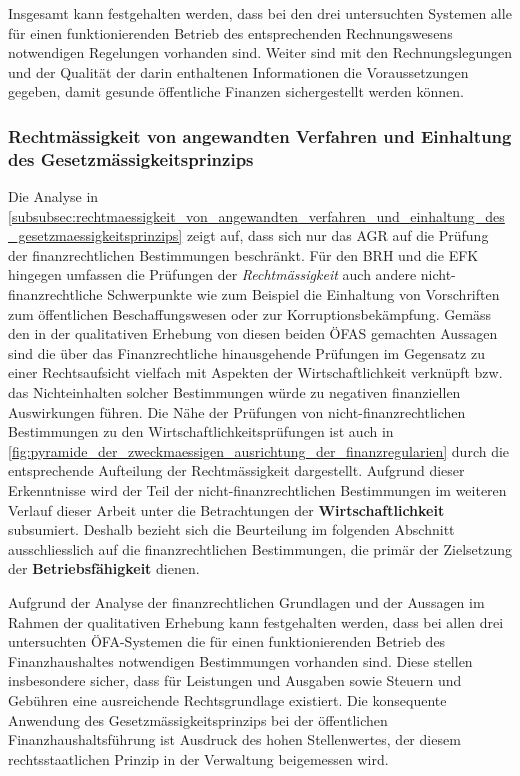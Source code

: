 \documentclass[10pt]{article}
\begin{document}
Insgesamt kann festgehalten werden, dass bei den drei untersuchten Systemen alle für einen funktionierenden Betrieb des entsprechenden Rechnungswesens notwendigen Regelungen vorhanden sind. Weiter sind mit den Rechnungslegungen und der Qualität der darin enthaltenen Informationen die Voraussetzungen gegeben, damit gesunde öffentliche Finanzen sichergestellt werden können.

\subsubsection{Rechtmässigkeit von angewandten Verfahren und Einhaltung des Gesetzmässigkeitsprinzips}\label{subsubsec:rechtmaessigkeit_von_angewandten_verfahren_und_einhaltung_des_gesetzmaessigkeitsprinzips}
Die Analyse in \vref{subsubsec:rechtmaessigkeit_von_angewandten_verfahren_und_einhaltung_des_gesetzmaessigkeitsprinzips} zeigt auf, dass sich nur das AGR auf die Prüfung der finanzrechtlichen Bestimmungen beschränkt. Für den BRH und die EFK hingegen umfassen die Prüfungen der \textit{Rechtmässigkeit} auch andere nicht-finanzrechtliche Schwerpunkte wie zum Beispiel die Einhaltung von Vorschriften zum öffentlichen Beschaffungswesen oder zur Korruptionsbekämpfung. Gemäss den in der qualitativen Erhebung von diesen beiden ÖFAS gemachten Aussagen sind die über das Finanzrechtliche hinausgehende Prüfungen im Gegensatz zu einer Rechtsaufsicht vielfach mit Aspekten der Wirtschaftlichkeit verknüpft bzw. das Nichteinhalten solcher Bestimmungen würde zu negativen finanziellen Auswirkungen führen. Die Nähe der Prüfungen von nicht-finanzrechtlichen Bestimmungen zu den Wirtschaftlichkeitsprüfungen ist auch in \vref{fig:pyramide_der_zweckmaessigen_ausrichtung_der_finanzregularien} durch die entsprechende Aufteilung der Rechtmässigkeit dargestellt. Aufgrund dieser Erkenntnisse wird der Teil der nicht-finanzrechtlichen Bestimmungen im weiteren Verlauf dieser Arbeit unter die Betrachtungen der \textbf{Wirtschaftlichkeit} subsumiert. Deshalb bezieht sich die Beurteilung im folgenden Abschnitt ausschliesslich auf die finanzrechtlichen Bestimmungen, die primär der Zielsetzung der \textbf{Betriebsfähigkeit} dienen.

Aufgrund der Analyse der finanzrechtlichen Grundlagen und der Aussagen im Rahmen der qualitativen Erhebung kann festgehalten werden, dass bei allen drei untersuchten ÖFA-Systemen die für einen funktionierenden Betrieb des Finanzhaus­haltes notwendigen Bestimmungen vorhanden sind. Diese stellen insbesondere sicher, dass für Leistungen und Ausgaben sowie Steuern und Gebühren eine ausreichende Rechtsgrundlage existiert. Die konsequente Anwendung des Gesetzmässigkeitsprinzips bei der öffentlichen Finanzhaushaltsführung ist Ausdruck des hohen Stellenwertes, der diesem rechtsstaatlichen Prinzip in der Verwaltung beigemessen wird.
\end{document}
